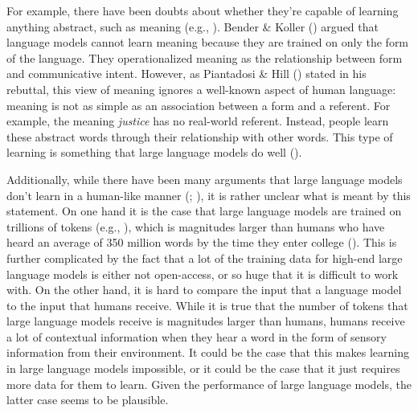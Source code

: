 \documentclass[
  12pt,
  letterpaper,
]{scrreprt}
\begin{document}
For example, there have been doubts about whether they're capable of
learning anything abstract, such as meaning (e.g.,
).
Bender \& Koller ()
argued that language models cannot learn meaning because they are
trained on only the form of the language. They operationalized meaning
as the relationship between form and communicative intent. However, as
Piantadosi \& Hill
() stated in his
rebuttal, this view of meaning ignores a well-known aspect of human
language: meaning is not as simple as an association between a form and
a referent. For example, the meaning \emph{justice} has no real-world
referent. Instead, people learn these abstract words through their
relationship with other words. This type of learning is something that
large language models do well
().

Additionally, while there have been many arguments that large language
models don't learn in a human-like manner
(;
), it
is rather unclear what is meant by this statement. On one hand it is the
case that large language models are trained on trillions of tokens
(e.g., ), which is magnitudes larger than humans who have heard an
average of 350 million words by the time they enter college
(). This is further complicated by the fact that a lot of the
training data for high-end large language models is either not
open-access, or so huge that it is difficult to work with. On the other
hand, it is hard to compare the input that a language model to the input
that humans receive. While it is true that the number of tokens that
large language models receive is magnitudes larger than humans, humans
receive a lot of contextual information when they hear a word in the
form of sensory information from their environment. It could be the case
that this makes learning in large language models impossible, or it
could be the case that it just requires more data for them to learn.
Given the performance of large language models, the latter case seems to
be plausible.
\end{document}
